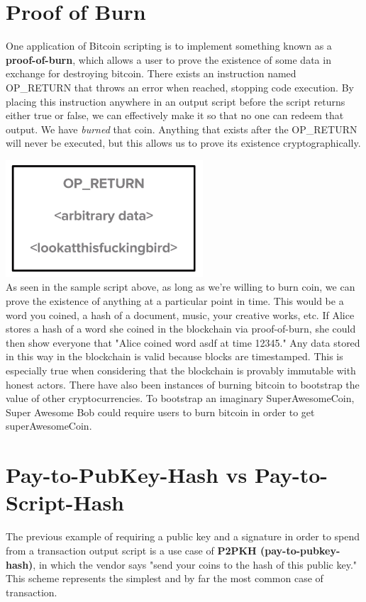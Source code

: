 \documentclass[11pt]{article}
\begin{document}
 \section*{Proof of Burn}
 
 One application of Bitcoin scripting is to implement something known as a \textbf{proof-of-burn}, which allows a user to prove the existence of some data in exchange for destroying bitcoin. There exists an instruction named OP\_RETURN that throws an error when reached, stopping code execution. By placing this instruction anywhere in an output script before the script returns either true or false, we can effectively make it so that no one can redeem that output. We have \textit{burned} that coin. Anything that exists after the OP\_RETURN will never be executed, but this allows us to prove its existence cryptographically.
 
 \includegraphics[scale=1]{burn_script} \\
 
 As seen in the sample script above, as long as we're willing to burn coin, we can prove the existence of anything at a particular point in time. This would be a word you coined, a hash of a document, music, your creative works, etc. If Alice stores a hash of a word she coined in the blockchain via proof-of-burn, she could then show everyone that "Alice coined word asdf at time 12345." Any data stored in this way in the blockchain is valid because blocks are timestamped. This is especially true when considering that the blockchain is provably immutable with honest actors. There have also been instances of burning bitcoin to bootstrap the value of other cryptocurrencies. To bootstrap an imaginary SuperAwesomeCoin, Super Awesome Bob could require users to burn bitcoin in order to get superAwesomeCoin. 
 
 \section*{Pay-to-PubKey-Hash vs Pay-to-Script-Hash}
 
 The previous example of requiring a public key and a signature in order to spend from a transaction output script is a use case of \textbf{P2PKH (pay-to-pubkey-hash)}, in which the vendor says "send your coins to the hash of this public key." This scheme represents the simplest and by far the most common case of transaction.
 
\end{document}
